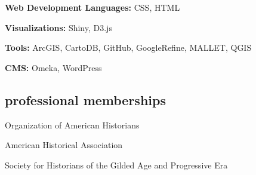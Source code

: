 \documentclass[11pt]{article}
\begin{document}
\textbf{Web Development Languages:} CSS, HTML

\textbf{Visualizations:} Shiny, D3.js

\textbf{Tools:} ArcGIS, CartoDB, GitHub, GoogleRefine, MALLET, QGIS

\textbf{CMS:} Omeka, WordPress

\subsection{professional memberships}
Organization of American Historians

American Historical Association

Society for Historians of the Gilded Age and Progressive Era
\end{document}
